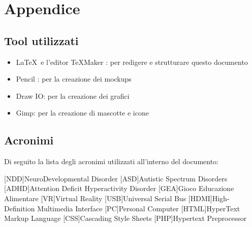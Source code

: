 \section{Appendice} \label{sec:app}

\subsection{Tool utilizzati} \label{subsec:tool}

\begin{itemize}
	\item \LaTeX\ e l'editor TeXMaker : per redigere e strutturare questo documento
	\item Pencil : per la creazione dei mockups
	\item Draw IO: per la creazione dei grafici
	\item Gimp: per la creazione di mascotte e icone
\end{itemize}

\subsection{Acronimi} \label{acr}
Di seguito la lista degli acronimi utilizzati all'interno del documento:
\begin{acronym}[NDD] 
[NDD]{NeuroDevelopmental Disorder}
[ASD]{Autistic Spectrum Disorders}
[ADHD]{Attention Deficit Hyperactivity Disorder}
[GEA]{Gioco Educazione Alimentare}
[VR]{Virtual Reality}
[USB]{Universal Serial Bus}
[HDMI]{High-Definition Multimedia Interface}
[PC]{Personal Computer}
[HTML]{HyperText Markup Language}
[CSS]{Cascading Style Sheets}
[PHP]{Hypertext Preprocessor}
\end{acronym}

\clearpage

